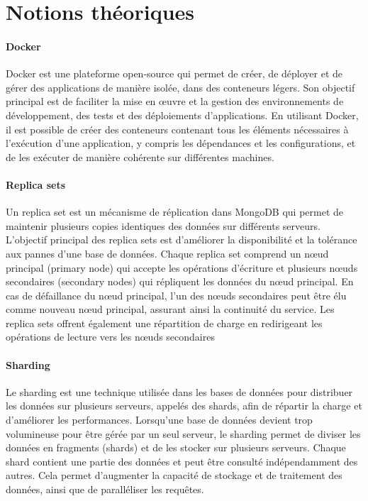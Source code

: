 \section{Notions théoriques}

\paragraph{Docker} Docker est une plateforme open-source qui permet de créer, de déployer et de gérer des applications
de manière isolée, dans des conteneurs légers. Son objectif principal est de faciliter la mise en œuvre et
la gestion des environnements de développement, des tests et des déploiements d'applications. En
utilisant Docker, il est possible de créer des conteneurs contenant tous les éléments nécessaires à
l'exécution d'une application, y compris les dépendances et les configurations, et de les exécuter de
manière cohérente sur différentes machines.

\paragraph{Replica sets} Un replica set est un mécanisme de réplication dans MongoDB qui permet de maintenir plusieurs copies
identiques des données sur différents serveurs. L'objectif principal des replica sets est d'améliorer la
disponibilité et la tolérance aux pannes d'une base de données. Chaque replica set comprend un nœud
principal (primary node) qui accepte les opérations d'écriture et plusieurs nœuds secondaires
(secondary nodes) qui répliquent les données du nœud principal. En cas de défaillance du nœud
principal, l'un des nœuds secondaires peut être élu comme nouveau nœud principal, assurant ainsi la
continuité du service. Les replica sets offrent également une répartition de charge en redirigeant les
opérations de lecture vers les nœuds secondaires

\paragraph{Sharding} Le sharding est une technique utilisée dans les bases de données pour distribuer les données sur
plusieurs serveurs, appelés des shards, afin de répartir la charge et d'améliorer les performances.
Lorsqu'une base de données devient trop volumineuse pour être gérée par un seul serveur, le sharding
permet de diviser les données en fragments (shards) et de les stocker sur plusieurs serveurs. Chaque
shard contient une partie des données et peut être consulté indépendamment des autres. Cela permet
d'augmenter la capacité de stockage et de traitement des données, ainsi que de paralléliser les
requêtes.

